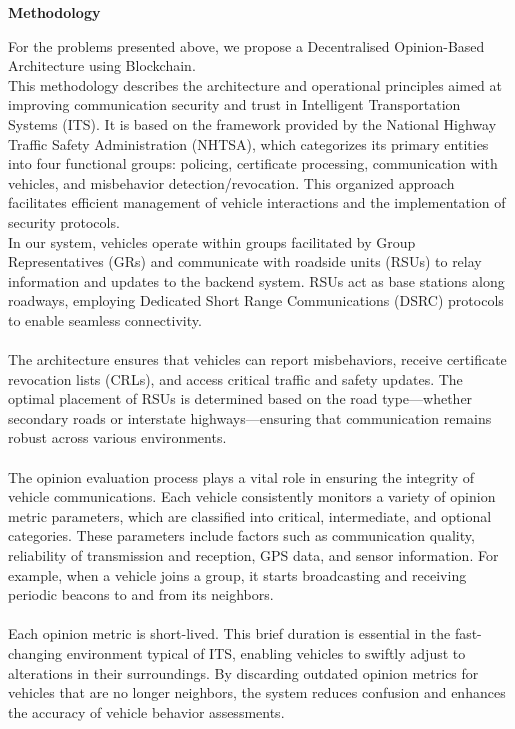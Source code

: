 \documentclass[a4paper,14pt]{extarticle}
\begin{document}
\newpage
\begin{center}
    {\LARGE \textbf{Methodology}} \\
    \vspace{1cm}
\end{center}
For the problems presented above, we propose a Decentralised Opinion-Based Architecture using Blockchain.
\\
This methodology describes the architecture and operational principles aimed at improving communication security and trust in Intelligent Transportation Systems (ITS). It is based on the framework provided by the National Highway Traffic Safety Administration (NHTSA), which categorizes its primary entities into four functional groups: policing, certificate processing, communication with vehicles, and misbehavior detection/revocation. This organized approach facilitates efficient management of vehicle interactions and the implementation of security protocols.
\\
In our system, vehicles operate within groups facilitated by Group Representatives (GRs) and communicate with roadside units (RSUs) to relay information and updates to the backend system. RSUs act as base stations along roadways, employing Dedicated Short Range Communications (DSRC) protocols to enable seamless connectivity.
\\ \\ 
The architecture ensures that vehicles can report misbehaviors, receive certificate revocation lists (CRLs), and access critical traffic and safety updates. The optimal placement of RSUs is determined based on the road type—whether secondary roads or interstate highways—ensuring that communication remains robust across various environments.
\\ \\
The opinion evaluation process plays a vital role in ensuring the integrity of vehicle communications. Each vehicle consistently monitors a variety of opinion metric parameters, which are classified into critical, intermediate, and optional categories. These parameters include factors such as communication quality, reliability of transmission and reception, GPS data, and sensor information. For example, when a vehicle joins a group, it starts broadcasting and receiving periodic beacons to and from its neighbors.
\\ \\ 
Each opinion metric is short-lived. This brief duration is essential in the fast-changing environment typical of ITS, enabling vehicles to swiftly adjust to alterations in their surroundings. By discarding outdated opinion metrics for vehicles that are no longer neighbors, the system reduces confusion and enhances the accuracy of vehicle behavior assessments.
\end{document}
